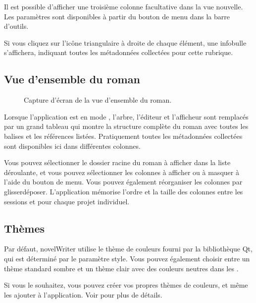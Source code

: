 \documentclass[a4paper,11pt,french]{sphinxmanual}
\begin{document}
\sphinxAtStartPar
Il est possible d’afficher une troisième colonne facultative dans la vue nouvelle. Les paramètres sont disponibles à partir du bouton de menu dans la barre d’outils.

\sphinxAtStartPar
Si vous cliquez sur l’icône triangulaire à droite de chaque élément, une infobulle s’affichera, indiquant toutes les métadonnées collectées pour cette rubrique.


\subsection{Vue d’ensemble du roman}
\label{\detokenize{usage_breakdown:novel-outline-view}}
\begin{figure}[htbp]
\centering
\capstart

\noindent{}
\caption{Capture d’écran de la vue d’ensemble du roman.}\label{\detokenize{usage_breakdown:id3}}\end{figure}

\sphinxAtStartPar
Lorsque l’application est en mode , l’arbre, l’éditeur et l’afficheur sont remplacés par un grand tableau qui montre la structure complète du roman avec toutes les balises et les références listées. Pratiquement toutes les métadonnées collectées sont disponibles ici dans différentes colonnes.

\sphinxAtStartPar
Vous pouvez sélectionner le dossier racine du roman à afficher dans la liste déroulante, et vous pouvez sélectionner les colonnes à afficher ou à masquer à l’aide du bouton de menu. Vous pouvez également réorganiser les colonnes par glisser\sphinxhyphen{}déposer. L’application mémorise l’ordre et la taille des colonnes entre les sessions et pour chaque projet individuel.


\subsection{Thèmes}
\label{\detokenize{usage_breakdown:colour-themes}}
\sphinxAtStartPar
Par défaut, novelWriter utilise le thème de couleurs fourni par la bibliothèque Qt, qui est déterminé par le paramètre  style. Vous pouvez également choisir entre un thème standard sombre et un thème clair avec des couleurs neutres dans les .

\sphinxAtStartPar
Si vous le souhaitez, vous pouvez créer vos propres thèmes de couleurs, et même les ajouter à l’application. Voir {\hyperref[\detokenize{more_customise:a-custom-theme}]{}} pour plus de détails.
\end{document}
